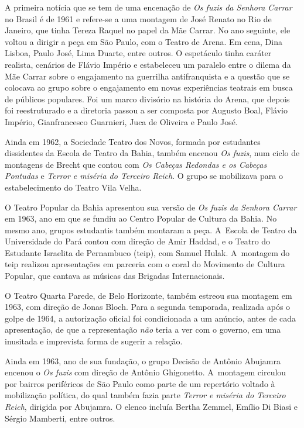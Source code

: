 A primeira notícia que se tem de uma encenação de {\it Os fuzis da
Senhora Carrar} no Brasil é de 1961 e refere-se a uma montagem de José
Renato no Rio de Janeiro, que tinha Tereza Raquel no papel da Mãe Carrar.
No ano seguinte, ele voltou a dirigir a peça em São Paulo, com o Teatro
de Arena. Em cena, Dina Lisboa, Paulo José, Lima Duarte, entre outros. O
espetáculo tinha caráter realista, cenários de Flávio Império e
estabeleceu um paralelo entre o dilema da Mãe Carrar sobre o engajamento
na guerrilha antifranquista e a questão que se colocava ao grupo sobre o
engajamento em novas experiências teatrais em busca de públicos
populares. Foi um marco divisório na história do Arena, que depois
foi reestruturado e a diretoria passou a ser composta por Augusto Boal,
Flávio Império, Gianfrancesco Guarnieri, Juca de Oliveira e Paulo José.

Ainda em 1962, a Sociedade Teatro dos Novos, formada por estudantes
dissidentes da Escola de Teatro da Bahia, também encenou {\it Os fuzis},
num ciclo de montagens de Brecht que contou com {\it Os Cabeças Redondas
e os Cabeças Pontudas} e {\it Terror e miséria do Terceiro Reich}. O
grupo se mobilizava para o estabelecimento do Teatro Vila Velha.

O Teatro Popular da Bahia apresentou sua versão de {\it Os fuzis da
Senhora Carrar} em 1963, ano em que se fundiu ao Centro Popular de
Cultura da Bahia. No mesmo ano, grupos estudantis também montaram a
peça. A~Escola de Teatro da Universidade do Pará contou com direção de
Amir Haddad, e o Teatro do Estudante Israelita de Pernambuco ({\sc teip}), com
Samuel Hulak. A~montagem do {\sc teip} realizou apresentações em parceria com
o coral do Movimento de Cultura Popular, que cantava as músicas das
Brigadas Internacionais.

O Teatro Quarta Parede, de Belo Horizonte, também estreou sua montagem
em 1963, com direção de Jonas Bloch. Para a segunda temporada, realizada
após o golpe de 1964, a autorização oficial foi condicionada a um
anúncio, antes de cada apresentação, de que a representação {\it não}
teria a ver com o governo, em uma inusitada e imprevista forma de
sugerir a relação.

Ainda em 1963, ano de sua fundação, o grupo Decisão de Antônio Abujamra
encenou o {\it Os fuzis} com direção de Antônio Ghigonetto. A~montagem
circulou por bairros periféricos de São Paulo como parte de um
repertório voltado à mobilização política, do qual também fazia parte
{\it Terror e miséria do Terceiro Reich}, dirigida por Abujamra. O
elenco incluía Bertha Zemmel, Emílio Di Biasi e Sérgio Mamberti, entre
outros.

